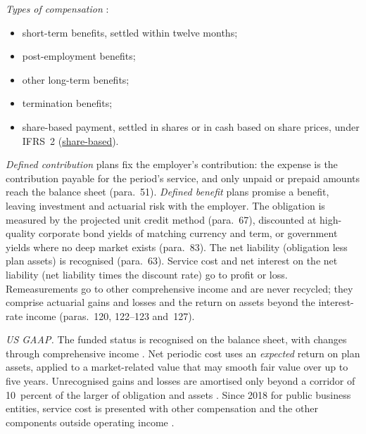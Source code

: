 \begin{qfmethod}\label{meth:post-employment-benefit-reporting}
 \emph{Types of compensation} \citep[IAS~19 para.~8]{eu-2023-1803-ias19}:
\begin{itemize}
\item short-term benefits, settled within twelve months;
\item post-employment benefits;
\item other long-term benefits;
\item termination benefits;
\item share-based payment, settled in shares or in cash based on share prices, under IFRS~2 (\hyperref[meth:share-based-compensation-reporting]{share-based}).
\end{itemize}

\emph{Defined contribution} plans fix the employer's contribution: the expense is the contribution payable for the period's service, and only unpaid or prepaid amounts reach the balance sheet (para.~51). \emph{Defined benefit} plans promise a benefit, leaving investment and actuarial risk with the employer. The obligation is measured by the projected unit credit method (para.~67), discounted at high-quality corporate bond yields of matching currency and term, or government yields where no deep market exists (para.~83). The net liability (obligation less plan assets) is recognised (para.~63). Service cost and net interest on the net liability (net liability times the discount rate) go to profit or loss. Remeasurements go to other comprehensive income and are never recycled; they comprise actuarial gains and losses and the return on assets beyond the interest-rate income (paras.~120, 122--123 and~127).

\emph{US GAAP.} The funded status is recognised on the balance sheet, with changes through comprehensive income \citep[p.~1]{us-pension-funded-status-2006}. Net periodic cost uses an \emph{expected} return on plan assets, applied to a market-related value that may smooth fair value over up to five years. Unrecognised gains and losses are amortised only beyond a corridor of 10~percent of the larger of obligation and assets \citep[paras.~20, 30, 32 and~34]{us-pensions-1985}. Since 2018 for public business entities, service cost is presented with other compensation and the other components outside operating income \citep[pp.~2--3]{us-pension-cost-presentation-2017}.


\end{qfmethod}
